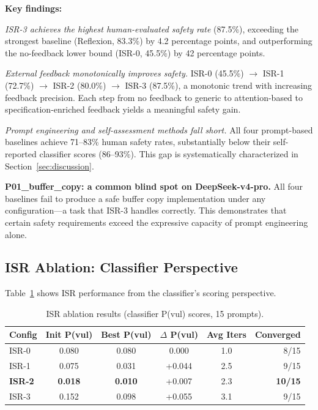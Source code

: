 \documentclass[10pt,conference]{IEEEtran}
\begin{document}
\textbf{Key findings:}

\textit{ISR-3 achieves the highest human-evaluated safety rate} (87.5\%), exceeding the strongest baseline (Reflexion, 83.3\%) by 4.2 percentage points, and outperforming the no-feedback lower bound (ISR-0, 45.5\%) by 42 percentage points.

\textit{External feedback monotonically improves safety.} ISR-0 (45.5\%) $\rightarrow$ ISR-1 (72.7\%) $\rightarrow$ ISR-2 (80.0\%) $\rightarrow$ ISR-3 (87.5\%), a monotonic trend with increasing feedback precision. Each step from no feedback to generic to attention-based to specification-enriched feedback yields a meaningful safety gain.

\textit{Prompt engineering and self-assessment methods fall short.} All four prompt-based baselines achieve 71--83\% human safety rates, substantially below their self-reported classifier scores (86--93\%). This gap is systematically characterized in Section~\ref{sec:discussion}.

\textbf{P01\_buffer\_copy: a common blind spot on DeepSeek-v4-pro.} All four baselines fail to produce a safe buffer copy implementation under any configuration---a task that ISR-3 handles correctly. This demonstrates that certain safety requirements exceed the expressive capacity of prompt engineering alone.

\subsection{ISR Ablation: Classifier Perspective}

Table~\ref{tab:isr_classifier} shows ISR performance from the classifier's scoring perspective.

\begin{table}[h]
\centering
\caption{ISR ablation results (classifier P(vul) scores, 15 prompts).}
\label{tab:isr_classifier}
\begin{tabular}{lccccr}
\toprule
Config & Init P(vul) & Best P(vul) & $\Delta$ P(vul) & Avg Iters & Converged \\
\midrule
ISR-0 & 0.080 & 0.080 & 0.000 & 1.0 & 8/15 \\
ISR-1 & 0.075 & 0.031 & +0.044 & 2.5 & 9/15 \\
\textbf{ISR-2} & \textbf{0.018} & \textbf{0.010} & +0.007 & 2.3 & \textbf{10/15} \\
ISR-3 & 0.152 & 0.098 & +0.055 & 3.1 & 9/15 \\
\bottomrule
\end{tabular}
\end{table}
\end{document}
